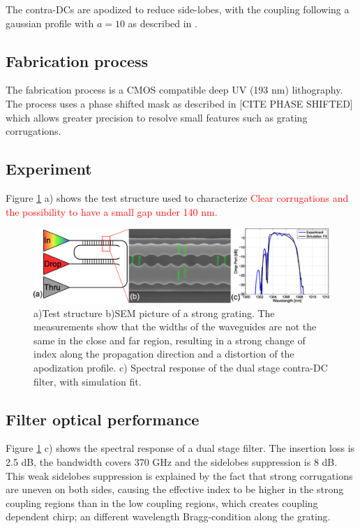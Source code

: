 \documentclass[letterpaper,10pt]{article}
\newcommand\todo[1]{\textcolor{red}{#1}}
\begin{document}
The contra-DCs are apodized to reduce side-lobes, with the coupling following a gaussian profile with $a=10$ as described in \cite{shi2013siliconContraDC}.


\subsection{Fabrication process}
The fabrication process is a CMOS compatible deep UV (193 nm) lithography. The process uses a phase shifted mask as described in [CITE PHASE SHIFTED] which allows greater precision to resolve small features such as grating corrugations.

\subsection{Experiment}
Figure \ref{fig:litho} a) shows the test structure used to characterize 
\todo{Clear corrugations and the possibility to have a small gap under 140 nm.}
\begin{figure}[htbp]
	\centering
	\includegraphics[width=.99\columnwidth]{SingleFilterFig}
	\caption{ a)Test structure b)SEM picture of a strong grating. The measurements show that the widths of the waveguides are not the same in the close and far region, resulting in a strong change of index along the propagation direction and a distortion of the apodization profile. c) Spectral response of the dual stage contra-DC filter, with simulation fit. }
	\label{fig:litho}
\end{figure}

\subsection{Filter optical performance}
Figure \ref{fig:litho} c) shows the spectral response of a dual stage filter. The insertion loss is 2.5 dB, the bandwidth covers 370 GHz and the sidelobes suppression is 8 dB. This weak sidelobes suppression is explained by the fact that strong corrugations are uneven on both sides, causing the effective index to be higher in the strong coupling regions than in the low coupling regions, which creates coupling dependent chirp; an different wavelength Bragg-condition along the grating. 
\end{document}
